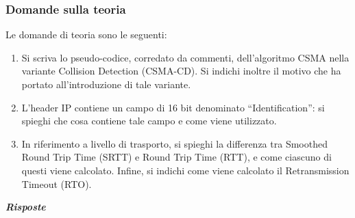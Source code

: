 \documentclass[a4paper]{article}
\newcommand{\dquotes}[1]{``#1''}
\begin{document}
	\subsubsection{Domande sulla teoria}
	Le domande di teoria sono le seguenti:
	\begin{enumerate}
		\item Si scriva lo pseudo-codice, corredato da commenti, dell'algoritmo CSMA nella variante Collision Detection (CSMA-CD). Si indichi inoltre il motivo che ha portato all'introduzione di tale variante.
		
		\item L'header IP contiene un campo di 16 bit denominato \dquotes{Identification}: si spieghi che cosa contiene tale campo e come viene utilizzato.
		
		\item In riferimento a livello di trasporto, si spieghi la differenza tra Smoothed Round Trip Time (SRTT) e Round Trip Time (RTT), e come ciascuno di questi viene calcolato. Infine, si indichi come viene calcolato il Retransmission Timeout (RTO).
	\end{enumerate}
	\textcolor{Green4}{\textbf{\emph{Risposte}}}
\end{document}
